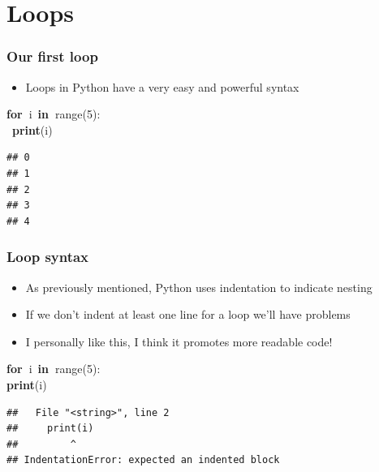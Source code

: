 \documentclass{beamer}\usepackage[]{graphicx}\usepackage[]{color}
\makeatletter
\newcommand{\hlnum}[1]{\textcolor[rgb]{0.686,0.059,0.569}{#1}}%
\newcommand{\hlopt}[1]{\textcolor[rgb]{0,0,0}{#1}}%
\newcommand{\hlstd}[1]{\textcolor[rgb]{0.345,0.345,0.345}{#1}}%
\newcommand{\hlkwa}[1]{\textcolor[rgb]{0.161,0.373,0.58}{\textbf{#1}}}%
\newcommand{\hlkwb}[1]{\textcolor[rgb]{0.69,0.353,0.396}{#1}}%
\newenvironment{kframe}{%
 \def\at@end@of@kframe{}%
 \ifinner\ifhmode%
  \def\at@end@of@kframe{\end{minipage}}%
  \begin{minipage}{\columnwidth}%
 \fi\fi%
 \def\FrameCommand##1{\hskip\@totalleftmargin \hskip-\fboxsep
 \colorbox{shadecolor}{##1}\hskip-\fboxsep
     \hskip-\linewidth \hskip-\@totalleftmargin \hskip\columnwidth}%
 \MakeFramed {\advance\hsize-\width
   \@totalleftmargin\z@ \linewidth\hsize
   \@setminipage}}%
 {\par\unskip\endMakeFramed%
 \at@end@of@kframe}
\newenvironment{knitrout}{}{} %
\makeatother
\begin{document}
\section{Loops}

\begin{frame}[fragile]
\frametitle{Our first loop}
\begin{itemize}
	\item Loops in Python have a very easy and powerful syntax

\end{itemize}
\begin{knitrout}
\color{fgcolor}\begin{kframe}
\noindent
\ttfamily
\hlstd{}\hlkwa{for\ }\hlstd{i\ }\hlkwa{in\ }\hlstd{}\hlkwb{range}\hlstd{}\hlopt{(}\hlstd{}\hlnum{5}\hlstd{}\hlopt{):}\hspace*{\fill}\\
\hlstd{\ }\hlkwa{print}\hlstd{}\hlopt{(}\hlstd{i}\hlopt{)}\hlstd{}\hspace*{\fill}
\mbox{}
\normalfont

\begin{verbatim}
## 0
## 1
## 2
## 3
## 4
\end{verbatim}
\end{kframe}
\end{knitrout}

\end{frame}

\begin{frame}[fragile]
\frametitle{Loop syntax}
\begin{itemize}
	\item As previously mentioned, Python uses indentation to indicate nesting

	\item If we don't indent at least one line for a loop we'll have problems

	\item I personally like this, I think it promotes more readable code!

\end{itemize}
\begin{knitrout}
\color{fgcolor}\begin{kframe}
\noindent
\ttfamily
\hlstd{}\hlkwa{for\ }\hlstd{i\ }\hlkwa{in\ }\hlstd{}\hlkwb{range}\hlstd{}\hlopt{(}\hlstd{}\hlnum{5}\hlstd{}\hlopt{):}\hspace*{\fill}\\
\hlstd{}\hlkwa{print}\hlstd{}\hlopt{(}\hlstd{i}\hlopt{)}\hlstd{}\hspace*{\fill}
\mbox{}
\normalfont

\begin{verbatim}
##   File "<string>", line 2
##     print(i)
##         ^
## IndentationError: expected an indented block
\end{verbatim}
\end{kframe}
\end{knitrout}

\end{frame}
\end{document}
